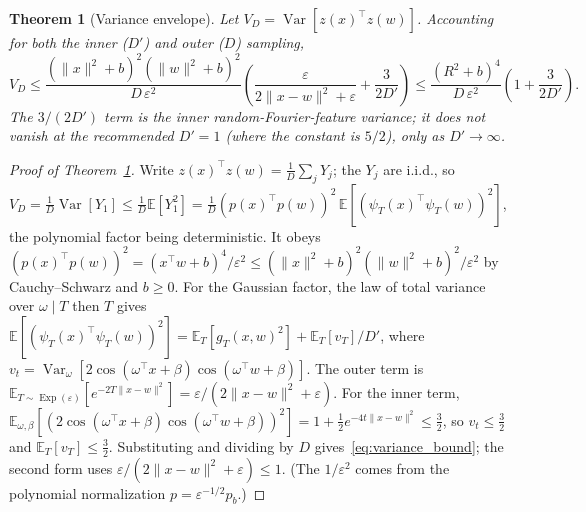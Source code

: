 \documentclass{article}
\newtheorem{theorem}{Theorem}[section]
\DeclareMathOperator{\Var}{Var}
\DeclareMathOperator{\Exp}{Exp}
\begin{document}
\begin{theorem}[Variance envelope]\label{thm:variance}
Let $V_D=\Var[z(x)^\top z(w)]$. Accounting for both the inner ($D'$) and outer ($D$) sampling,
\begin{equation}\label{eq:variance_bound}
V_D \le \frac{(\|x\|^2+b)^2(\|w\|^2+b)^2}{D\,\varepsilon^2}\!\left(\frac{\varepsilon}{2\|x-w\|^2+\varepsilon}+\frac{3}{2D'}\right) \le \frac{(R^2+b)^4}{D\,\varepsilon^2}\!\left(1+\frac{3}{2D'}\right).
\end{equation}
The $3/(2D')$ term is the inner random-Fourier-feature variance; it does not vanish at the recommended $D'=1$ (where the constant is $5/2$), only as $D'\to\infty$.
\end{theorem}
\begin{proof}[Proof of Theorem~\ref{thm:variance}]
Write $z(x)^\top z(w)=\frac1D\sum_j Y_j$; the $Y_j$ are i.i.d., so $V_D=\frac1D\Var[Y_1]\le\frac1D\mathbb{E}[Y_1^2]=\frac1D(p(x)^\top p(w))^2\,\mathbb{E}[(\psi_T(x)^\top\psi_T(w))^2]$, the polynomial factor being deterministic. It obeys $(p(x)^\top p(w))^2=(x^\top w+b)^4/\varepsilon^2\le(\|x\|^2+b)^2(\|w\|^2+b)^2/\varepsilon^2$ by Cauchy--Schwarz and $b\ge0$. For the Gaussian factor, the law of total variance over $\omega\mid T$ then $T$ gives $\mathbb{E}[(\psi_T(x)^\top\psi_T(w))^2]=\mathbb{E}_T[g_T(x,w)^2]+\mathbb{E}_T[v_T]/D'$, where $v_t=\Var_\omega[2\cos(\omega^\top x+\beta)\cos(\omega^\top w+\beta)]$. The outer term is $\mathbb{E}_{T\sim\Exp(\varepsilon)}[e^{-2T\|x-w\|^2}]=\varepsilon/(2\|x-w\|^2+\varepsilon)$. For the inner term, $\mathbb{E}_{\omega,\beta}[(2\cos(\omega^\top x+\beta)\cos(\omega^\top w+\beta))^2]=1+\tfrac12 e^{-4t\|x-w\|^2}\le\tfrac32$, so $v_t\le\tfrac32$ and $\mathbb{E}_T[v_T]\le\tfrac32$. Substituting and dividing by $D$ gives~\eqref{eq:variance_bound}; the second form uses $\varepsilon/(2\|x-w\|^2+\varepsilon)\le1$. (The $1/\varepsilon^2$ comes from the polynomial normalization $p=\varepsilon^{-1/2}p_b$.)
\end{proof}
\end{document}

